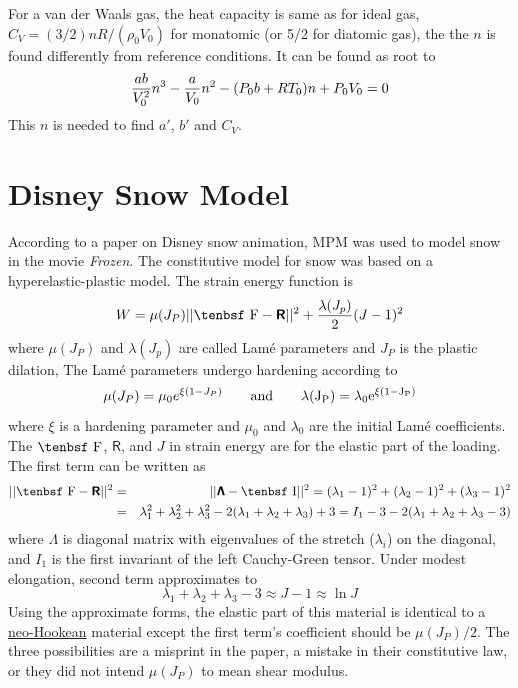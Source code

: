 \documentclass[11pt]{book}
\newcommand{\tens}[1]{\boldsymbol{\mathsf{#1}}}
\def\F{\hbox{\tenbsf F}}
\def\I{\hbox{\tenbsf I}}
\begin{document}
For a van der Waals gas, the heat capacity is same as for ideal gas, $C_V=(3/2)nR/(\rho_0 V_0)$ for monatomic (or 5/2 for diatomic gas), the the $n$ is found differently from reference conditions. It can be found as root to
\begin{equation}
     {ab\over V_0^2} n^3 - {a\over V_0} n^2 - (P_0b+RT_0)n + P_0V_0 = 0
\end{equation}
This $n$ is needed to find $a'$, $b'$ and $C_V$.

\section{Disney Snow Model}

According to a paper on Disney snow animation, MPM was used to model snow in the movie {\em Frozen}. The constitutive model for snow was based on a hyperelastic-plastic model. The strain energy function is
\begin{equation}
   W= \mu(J_P) || \F - \tens R ||^2 + {\lambda(J_p)\over 2}(J-1)^2
\end{equation}
where $\mu(J_P)$ and $\lambda(J_p)$ are called Lam\'e parameters and $J_P$ is the plastic dilation, The Lam\'e parameters undergo hardening according to
\begin{equation}
   \mu(J_P) = \mu_0 e^{\xi(1-J_P)} \qquad \rm and \qquad \lambda(J_P) = \lambda_0 e^{\xi(1-J_P)}
\end{equation}
where $\xi$ is a hardening parameter and $\mu_0$ and $\lambda_0$ are the initial Lam\'e coefficients. The $\F$, $\tens R$, and $J$ in strain energy are for the elastic part of the loading. The first term can be written as
\begin{eqnarray}
  || \F - \tens R ||^2 & = & || \tens\Lambda-\I ||^2 = (\lambda_1-1)^2 + (\lambda_2-1)^2 + (\lambda_3-1)^2 \\
         & = & \lambda_1^2 + \lambda_2^2 + \lambda_3^2 -2(\lambda_1 + \lambda_2 + \lambda_3)+3
         = I_1 -3 -2(\lambda_1 + \lambda_2 + \lambda_3-3)
\end{eqnarray}
where $\tens\Lambda$ is diagonal matrix with eigenvalues of the stretch ($\lambda_i$) on the diagonal, and $I_1$ is the first invariant of the left Cauchy-Green tensor. Under modest elongation, second term approximates to
\begin{equation}
  \lambda_1 + \lambda_2 + \lambda_3-3 \approx J - 1 \approx \ln J
\end{equation}
Using the approximate forms, the elastic part of this material is identical to a \hyperref[NHM]{neo-Hookean} material except the first term's coefficient should be $\mu(J_P)/2$. The three possibilities are a misprint in the paper, a mistake in their constitutive law, or they did not intend $\mu(J_P)$ to mean shear modulus.
\end{document}
